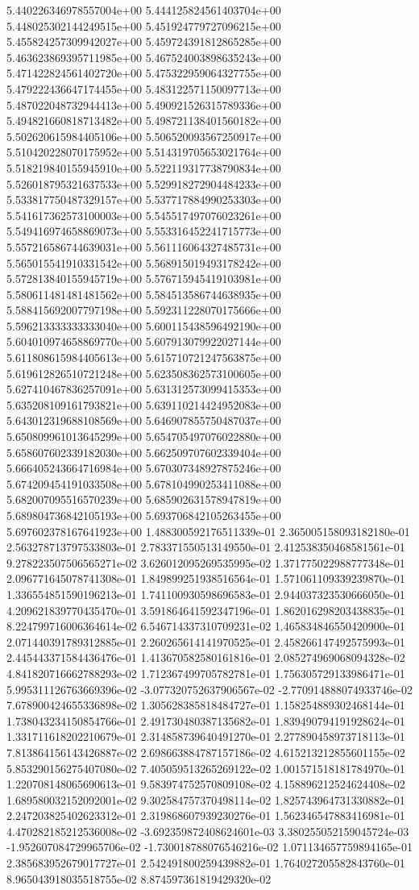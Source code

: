 5.440226346978557004e+00	5.444125824561403704e+00	5.448025302144249515e+00	5.451924779727096215e+00	5.455824257309942027e+00	5.459724391812865285e+00	5.463623869395711985e+00	5.467524003898635243e+00	5.471422824561402720e+00	5.475322959064327755e+00	5.479222436647174455e+00	5.483122571150097713e+00	5.487022048732944413e+00	5.490921526315789336e+00	5.494821660818713482e+00	5.498721138401560182e+00	5.502620615984405106e+00	5.506520093567250917e+00	5.510420228070175952e+00	5.514319705653021764e+00	5.518219840155945910e+00	5.522119317738790834e+00	5.526018795321637533e+00	5.529918272904484233e+00	5.533817750487329157e+00	5.537717884990253303e+00	5.541617362573100003e+00	5.545517497076023261e+00	5.549416974658869073e+00	5.553316452241715773e+00	5.557216586744639031e+00	5.561116064327485731e+00	5.565015541910331542e+00	5.568915019493178242e+00	5.572813840155945719e+00	5.576715945419103981e+00	5.580611481481481562e+00	5.584513586744638935e+00	5.588415692007797198e+00	5.592311228070175666e+00	5.596213333333333040e+00	5.600115438596492190e+00	5.604010974658869770e+00	5.607913079922027144e+00	5.611808615984405613e+00	5.615710721247563875e+00	5.619612826510721248e+00	5.623508362573100605e+00	5.627410467836257091e+00	5.631312573099415353e+00	5.635208109161793821e+00	5.639110214424952083e+00	5.643012319688108569e+00	5.646907855750487037e+00	5.650809961013645299e+00	5.654705497076022880e+00	5.658607602339182030e+00	5.662509707602339404e+00	5.666405243664716984e+00	5.670307348927875246e+00	5.674209454191033508e+00	5.678104990253411088e+00	5.682007095516570239e+00	5.685902631578947819e+00	5.689804736842105193e+00	5.693706842105263455e+00	5.697602378167641923e+00
1.488300592176511339e-01	2.365005158093182180e-01	2.563278713797533803e-01	2.783371550513149550e-01	2.412538350468581561e-01	9.278223507506565271e-02	3.626012095269535995e-02	1.371775022988777348e-01	2.096771645078741308e-01	1.849899251938516564e-01	1.571061109339239870e-01	1.336554851590196213e-01	1.741100930598696583e-01	2.944037323530666050e-01	4.209621839770435470e-01	3.591864641592347196e-01	1.862016298203438835e-01	8.224799716006364614e-02	6.546714337310709231e-02	1.465834846550420900e-01	2.071440391789312885e-01	2.260265614141970525e-01	2.458266147492575993e-01	2.445443371584436476e-01	1.413670582580161816e-01	2.085274969068094328e-02	4.841820716662788293e-02	1.712367499705782781e-01	1.756305729133986471e-01	5.995311126763669396e-02	-3.077320752637906567e-02	-2.770914888074933746e-02	7.678900424655336898e-02	1.305628385818484727e-01	1.158254889302468144e-01	1.738043234150854766e-01	2.491730480387135682e-01	1.839490794191928624e-01	1.331711618202210679e-01	2.314858739640491270e-01	2.277890458973718113e-01	7.813864156143426887e-02	2.698663884787157186e-02	4.615213212855601155e-02	5.853290156275407080e-02	7.405059513265269122e-02	1.001571518181784970e-01	1.220708148065690613e-01	9.583974752570809108e-02	4.158896212524624408e-02	1.689580032152092001e-02	9.302584757370498114e-02	1.825743964731330882e-01	2.247203825402623312e-01	2.319868607939230276e-01	1.562346547883416981e-01	4.470282185212536008e-02	-3.692359872408624601e-03	3.380255052159045724e-03	-1.952607084729965706e-02	-1.730018788076546216e-02	1.071134657759894165e-01	2.385683952679017727e-01	2.542491800259439882e-01	1.764027205582843760e-01	8.965043918035518755e-02	8.874597361819429320e-02
